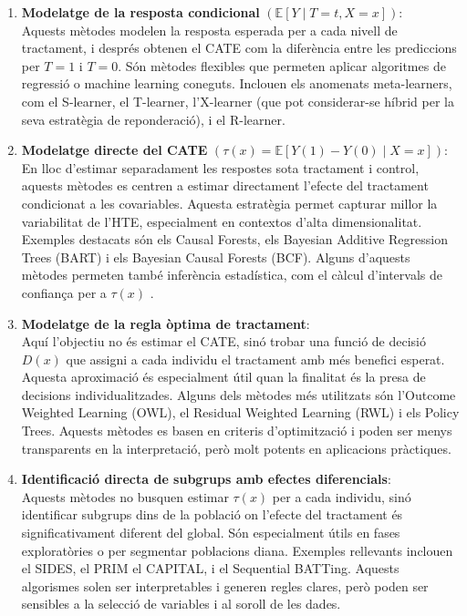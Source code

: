 \documentclass[../main.tex]{subfiles}
\begin{document}
    \begin{enumerate}
    \item \textbf{Modelatge de la resposta condicional} $(\mathbb{E}[Y \mid T = t, X = x])$:\\
    Aquests mètodes modelen la resposta esperada per a cada nivell de tractament, i després obtenen el CATE com la diferència entre les prediccions per $T = 1$ i $T = 0$. Són mètodes flexibles que permeten aplicar algoritmes de regressió o machine learning coneguts. Inclouen els anomenats meta-learners, com el S-learner, el T-learner, l’X-learner (que pot considerar-se híbrid per la seva estratègia de reponderació), i el R-learner. 
    \item \textbf{Modelatge directe del CATE} $(\tau(x) = \mathbb{E}[Y(1) - Y(0) \mid X = x])$:\\
    En lloc d’estimar separadament les respostes sota tractament i control, aquests mètodes es centren a estimar directament l’efecte del tractament condicionat a les covariables. Aquesta estratègia permet capturar millor la variabilitat de l’HTE, especialment en contextos d’alta dimensionalitat. Exemples destacats són els Causal Forests, els Bayesian Additive Regression Trees (BART) i els Bayesian Causal Forests (BCF). Alguns d’aquests mètodes permeten també inferència estadística, com el càlcul d’intervals de confiança per a $\tau(x)$ .
    \item \textbf{Modelatge de la regla òptima de tractament}:\\
    Aquí l’objectiu no és estimar el CATE, sinó trobar una funció de decisió $D(x)$ que assigni a cada individu el tractament amb més benefici esperat. Aquesta aproximació és especialment útil quan la finalitat és la presa de decisions individualitzades. Alguns dels mètodes més utilitzats són l’Outcome Weighted Learning (OWL), el Residual Weighted Learning (RWL) i els Policy Trees. Aquests mètodes es basen en criteris d’optimització i poden ser menys transparents en la interpretació, però molt potents en aplicacions pràctiques.
    \item \textbf{Identificació directa de subgrups amb efectes diferencials}:\\
    Aquests mètodes no busquen estimar $\tau(x)$ per a cada individu, sinó identificar subgrups dins de la població on l’efecte del tractament és significativament diferent del global. Són especialment útils en fases exploratòries o per segmentar poblacions diana. Exemples rellevants inclouen el SIDES, el PRIM el CAPITAL, i el Sequential BATTing. Aquests algorismes solen ser interpretables i generen regles clares, però poden ser sensibles a la selecció de variables i al soroll de les dades.
    \end{enumerate}
    
\end{document}

